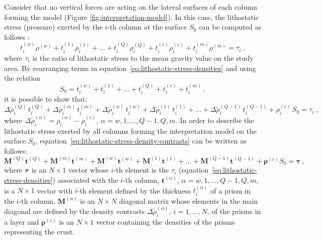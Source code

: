 \documentclass[manuscript]{geophysics}
\begin{document}
Consider that no vertical forces are acting on the lateral surfaces of 
each column forming the model (Figure \ref{fig:interpretation-model}). In this case, 
the lithostatic stress (pressure) exerted by the $i$-th column at the surface $S_{0}$
can be computed as follows \citep{turcotte-schubert2002}:
\begin{equation}
t^{(w)}_{i} \rho^{(w)} + t^{(1)}_{i} \rho^{(1)}_{i} + \dots + 
t^{(Q)}_{i} \rho^{(Q)}_{i} + t^{(c)}_{i} \rho^{(c)}_{i} + t^{(m)}_{i} \rho^{(m)} 
= \tau_{i} \: ,
\label{eq:lithostatic-stress-densities}
\end{equation}
where $\tau_{i}$ is the ratio of lithostatic stress to the mean gravity 
value on the study area.
By rearranging terms in equation~\ref{eq:lithostatic-stress-densities} 
and using the relation
\begin{equation}
S_{0} = t^{(w)}_{i} + t^{(1)}_{i} + \dots + t^{(Q)}_{i} + t^{(c)}_{i} + t^{(m)}_{i} \: ,
\label{eq:S0}
\end{equation}
it is possible to show that:
\begin{equation}
\Delta \tilde{\rho}^{(Q)}_{i} \, t^{(Q)}_{i} + 
\Delta \tilde{\rho}^{(m)}_{i} \, t^{(m)}_{i} + 
\Delta \tilde{\rho}^{(w)}_{i} \, t^{(w)}_{i} + 
\Delta \tilde{\rho}^{(1)}_{i} \, t^{(1)}_{i} +
\dots + 
\Delta \tilde{\rho}^{(Q-1)}_{i} \, t^{(Q-1)}_{i} +
\rho^{(c)}_{i} \, S_{0} = \tau_{i} \: ,
\label{eq:lithostatic-stress-density-contrasts}
\end{equation}
where $\Delta \tilde{\rho}^{(\alpha)}_{i} = \rho^{(\alpha)}_{i} - \rho^{(c)}_{i}$, 
$\alpha = w, 1, \dots, Q-1, Q, m$.
In order to describe the lithostatic stress exerted by all columns forming the
interpretation model on the surface $S_{0}$, 
equation~\ref{eq:lithostatic-stress-density-contrasts} 
can be written as follows:
\begin{equation}
\mathbf{M}^{(Q)} \mathbf{t}^{(Q)} + \mathbf{M}^{(m)} \mathbf{t}^{(m)} + \mathbf{M}^{(w)}
\mathbf{t}^{(w)} + \mathbf{M}^{(1)} \mathbf{t}^{(1)} + \dots + \mathbf{M}^{(Q-1)}
\mathbf{t}^{(Q-1)} + \boldsymbol{\rho}^{(c)} S_{0} = \boldsymbol{\tau} \: ,
\label{eq:lithostatic-stress-matrix}
\end{equation}
where $\boldsymbol{\tau}$ is an $N \times 1$ vector whose $i$-th element is
the $\tau_{i}$ (equation~\ref{eq:lithostatic-stress-densities}) associated with
the $i$-th column, $\mathbf{t}^{(\alpha)}$, $\alpha = w, 1, \dots, Q-1, Q, m$, 
is a $N \times 1$ vector with $i$-th element defined by the thickness 
$t^{(\alpha)}_{i}$ of a prism in the $i$-th column, $\mathbf{M}^{(\alpha)}$ is an $N \times N$ diagonal matrix whose elements in the main diagonal are defined by the density contrasts 
$\Delta \tilde{\rho}^{(\alpha)}_{i}$, $i = 1, \dots, N$, of the prisms in a layer and
$\boldsymbol{\rho}^{(c)}$ is an $N \times 1$ vector containing the densities of the prisms
representing the crust. 
\end{document}
